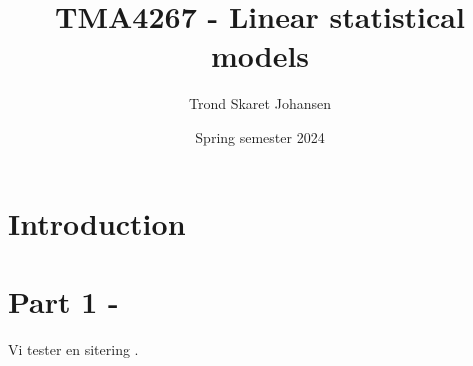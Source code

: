 \documentclass[12pt, letterpaper]{article}
\title{TMA4267 - Linear statistical models}
\date{Spring semester 2024}
\author{Trond Skaret Johansen}
\begin{document}
\maketitle
\tableofcontents
\newpage

\section{Introduction} 

\label{sec:introduction}


\newpage

\newpage
\section{Part 1 - }
\label{sec:P1}



Vi tester en sitering \cite{test}.

% 

% 

% 

% 

% 


\newpage\printbibliography{}
\newpage\printindex{}
\end{document}
